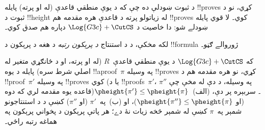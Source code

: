 \documentclass[../../../include/open-logic-section]{subfiles}
\begin{document}


د  ثبوت ښودلې ده چې که  د يوې منطقي قاعدې (له \RightR{\lexists} او \LeftR{\lforall} پرته) پايله !!{prove}s کړي، نو د ثبوت د !!{height} له زياتولو پرته د قاعدې هره مقدمه هم !!{prove}s کوي۔ لا قوي پايله ښودلے شو: دا خاصيت د $\Log{G3c} +
\CutCS$ دپاره هم صدق کوي۔

لکه مخکې، د \CutCS{} د استنتاج \emph{د پرېکون رتبه} د هغه د پرېکون د !!{formula} ژوروالے ګڼو۔

\begin{lem}
که $\Log{G3c} + \CutCS$ د يوې منطقي قاعدې~$R$ (له \RightR{\lexists} او \LeftR{\lforall} پرته، او د ځانګړي متغير له اصلي شرط سره) پايله د يوه !!a{proof}~$\pi$ په وسيله !!{prove}s کړي، نو هره مقدمه هم د !!{proof}~$\pi'$ په وسيله !!{prove}s کوي (يا د !!{proof}s~$\pi'$، $\pi''$ په وسيله، د دې له مخې چې قاعده يوه مقدمه لري که دوه)۔ سربېره پر دې،
(الف)~$\pheight{\pi'}\le\pheight{\pi}$ (او $\pheight{\pi''}\le\pheight{\pi}$)، او (ب)~په~$\pi'$ (او $\pi''$) کښې د \CutCS{} د استنتاجونو شمېر په~$\pi$ کښې له شمېر څخه زيات نۀ دے؛ هر پاتې پرېکون د پخواني پرېکون په هماغه رتبه راځي۔
\end{lem}
\end{document}
